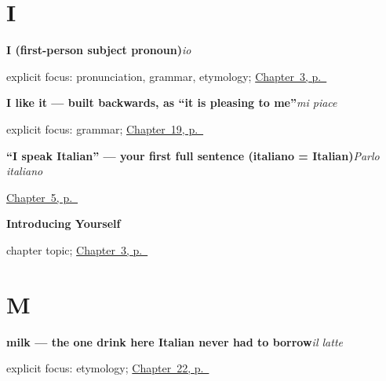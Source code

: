 \section*{I}

\noindent\begin{minipage}[t]{\linewidth}
\raggedright
\textbf{I (first-person subject pronoun)}\enspace\emph{io}\par
\footnotesize explicit focus: pronunciation, grammar, etymology; \hyperref[ch:it-introductions]{Chapter~3, p.~\pageref*{ch:it-introductions}}
\end{minipage}\par\smallskip

\noindent\begin{minipage}[t]{\linewidth}
\raggedright
\textbf{I like it — built backwards, as \textquotedblleft{}it is pleasing to me\textquotedblright{}}\enspace\emph{mi piace}\par
\footnotesize explicit focus: grammar; \hyperref[ch:it-backwards-verb]{Chapter~19, p.~\pageref*{ch:it-backwards-verb}}
\end{minipage}\par\smallskip

\noindent\begin{minipage}[t]{\linewidth}
\raggedright
\textbf{\textquotedblleft{}I speak Italian\textquotedblright{} — your first full sentence (italiano = Italian)}\enspace\emph{Parlo italiano}\par
\footnotesize \hyperref[ch:it-first-verbs]{Chapter~5, p.~\pageref*{ch:it-first-verbs}}
\end{minipage}\par\smallskip

\noindent\begin{minipage}[t]{\linewidth}
\raggedright
\textbf{Introducing Yourself}\par
\footnotesize chapter topic; \hyperref[ch:it-introductions]{Chapter~3, p.~\pageref*{ch:it-introductions}}
\end{minipage}\par\smallskip

\section*{M}

\noindent\begin{minipage}[t]{\linewidth}
\raggedright
\textbf{milk — the one drink here Italian never had to borrow}\enspace\emph{il latte}\par
\footnotesize explicit focus: etymology; \hyperref[ch:it-coffee-tea-milk-sugar]{Chapter~22, p.~\pageref*{ch:it-coffee-tea-milk-sugar}}
\end{minipage}\par\smallskip

